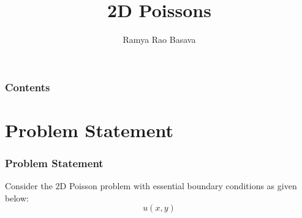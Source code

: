 \documentclass[9pt]{beamer}
\title{2D Poissons}
\author{Ramya Rao Basava}
\institute{Department of Computer Science, UBC}
\date{}
\begin{document}
\begin{frame}
\titlepage
\end{frame}

\begin{frame}
\label{contents}
\frametitle{Contents}
\tableofcontents
\end{frame}

\section{Problem Statement}

\begin{frame}

\frametitle{Problem Statement}

Consider the 2D Poisson problem with essential boundary conditions as given
below:
\[ u(x,y) \]

\end{frame}
\end{document}
